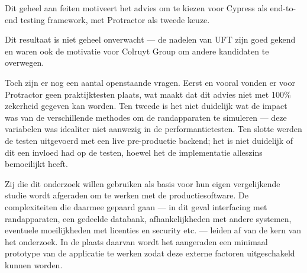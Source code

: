 Dit geheel aan feiten motiveert het advies om te kiezen voor Cypress als end-to-end testing framework, met Protractor als tweede keuze.

Dit resultaat is niet geheel onverwacht — de nadelen van UFT zijn goed gekend en waren ook de motivatie voor Colruyt Group om andere kandidaten te overwegen.

Toch zijn er nog een aantal openstaande vragen. Eerst en vooral vonden er voor Protractor geen praktijktesten plaats, wat maakt dat dit advies niet met 100\% zekerheid gegeven kan worden. Ten tweede is het niet duidelijk wat de impact was van de verschillende methodes om de randapparaten te simuleren — deze variabelen was idealiter niet aanwezig in de performantietesten. Ten slotte werden de testen uitgevoerd met een live pre-productie backend; het is niet duidelijk of dit een invloed had op de testen, hoewel het de implementatie alleszins bemoeilijkt heeft.

Zij die dit onderzoek willen gebruiken als basis voor hun eigen vergelijkende studie wordt afgeraden om te werken met de productiesoftware. De complexiteiten die daarmee gepaard gaan — in dit geval interfacing met randapparaten, een gedeelde databank, afhankelijkheden met andere systemen, eventuele moeilijkheden met licenties en security etc. — leiden af van de kern van het onderzoek. In de plaats daarvan wordt het aangeraden een minimaal prototype van de applicatie te werken zodat deze externe factoren uitgeschakeld kunnen worden.
